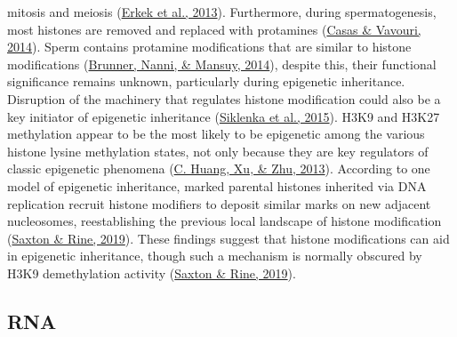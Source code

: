 \documentclass[12pt,twoside]{reedthesis}
\begin{document}
mitosis and meiosis (\protect\hyperlink{ref-erkek2013}{Erkek et al., 2013}). Furthermore, during spermatogenesis,
most histones are removed and replaced with protamines (\protect\hyperlink{ref-casas2014}{Casas \& Vavouri, 2014}).
Sperm contains protamine modifications that are similar to histone
modifications (\protect\hyperlink{ref-brunner2014}{Brunner, Nanni, \& Mansuy, 2014}), despite this, their functional
significance remains unknown, particularly during epigenetic
inheritance. Disruption of the machinery that regulates histone
modification could also be a key initiator of epigenetic inheritance (\protect\hyperlink{ref-siklenka2015}{Siklenka et al., 2015}). H3K9
and H3K27 methylation appear to be the most likely to be epigenetic
among the various histone lysine methylation states, not only because
they are key regulators of classic epigenetic phenomena (\protect\hyperlink{ref-huang2013}{C. Huang, Xu, \& Zhu, 2013}).
According to one model of epigenetic inheritance, marked parental
histones inherited via DNA replication recruit histone modifiers to
deposit similar marks on new adjacent nucleosomes, reestablishing the
previous local landscape of histone modification (\protect\hyperlink{ref-saxton2019}{Saxton \& Rine, 2019}). These
findings suggest that histone modifications can aid in epigenetic
inheritance, though such a mechanism is normally obscured by H3K9
demethylation activity (\protect\hyperlink{ref-saxton2019}{Saxton \& Rine, 2019}).

\hypertarget{rna}{%
\subsection*{RNA}\label{rna}}
\end{document}

